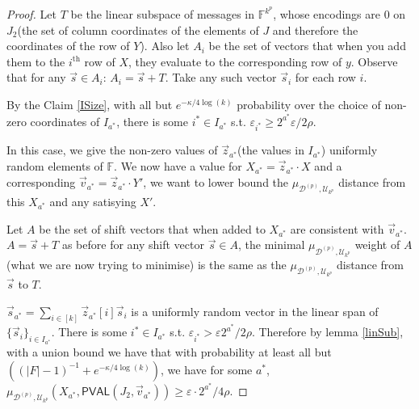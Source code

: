 \documentclass[11pt]{article}
\newcommand{\PVAL}{\mathsf{PVAL}}
\begin{document}
\begin{proof}
Let $T$ be the linear subspace of messages in $\mathbb{F}^{k^{p}}$, whose encodings are $0$ on $J_{2}$(the set of column coordinates of the elements of $J$ and therefore the coordinates of the row of $Y$). Also let $A_{i}$ be the set of vectors that when you add them to the $i^{\text{th}}$ row of $X$, they evaluate to the corresponding row of $y$. Observe that for any $\vec{s}\in A_{i}$: $A_{i}=\vec{s}+T$. Take any such vector $\vec{s}_{i}$ for each row $i$.

By the Claim \ref{ISize}, with all but $e^{-\kappa/4\log (k)}$ probability over the choice of non-zero coordinates of $I_{a^{\ast}}$, there is some $i^{\ast}\in I_{a^{\ast}}$ s.t. $\varepsilon_{i^{\ast}}\geq 2^{a^{\ast}}\varepsilon/2\rho$.

In this case, we give the non-zero values of $\vec{z}_{a^{\ast}}$(the values in $I_{a^{\ast}}$) uniformly random elements of $\mathbb{F}$. We now have a value for $X_{a^{\ast}}=\vec{z}_{a^{\ast}}\cdot X$ and a corresponding $\vec{v}_{a^{\ast}}=\vec{z}_{a^{\ast}}\cdot Y'$, we want to lower bound the $\mu_{\mathcal{D}^{(p)},\mathcal{U}_{k^{p}}}$ distance from this $X_{a^{\ast}}$ and any satisying $X'$.

Let $A$ be the set of shift vectors that when added to $X_{a^{\ast}}$ are consistent with $\vec{v}_{a^{\ast}}$. $A=\vec{s}+T$ as before for any shift vector $\vec{s}\in A$, the minimal $\mu_{\mathcal{D}^{(p)},\mathcal{U}_{k^{p}}}$ weight of $A$ (what we are now trying to minimise) is the same as the $\mu_{\mathcal{D}^{(p)},\mathcal{U}_{k^{p}}}$ distance from $\vec{s}$ to $T$.

$\vec{s}_{a^{\ast}}=\sum_{i\in [k]}\vec{z}_{a^{\ast}}[i]\vec{s}_{i}$ is a uniformly random vector in the linear span of $\{\vec{s}_{i}\}_{i\in I_{a^{\ast}}}$. There is some $i^{\ast}\in I_{a^{\ast}}$ s.t. $\varepsilon_{i^{\ast}}>\varepsilon2^{a^{\ast}}/2\rho$. Therefore by lemma \ref{linSub}, with a union bound we have that with probability at least all but $((\vert F\vert -1)^{-1}+e^{-\kappa/4 \log (k)} )$, we have for some $a^{\ast}$, $\mu_{\mathcal{D}^{(p)},\mathcal{U}_{k^{p}}}(X_{a^{\ast}},\PVAL(J_{2},\vec{v}_{a^{\ast}}))\geq \varepsilon\cdot2^{a^{\ast}}/4\rho$.
\end{proof}
\end{document}
